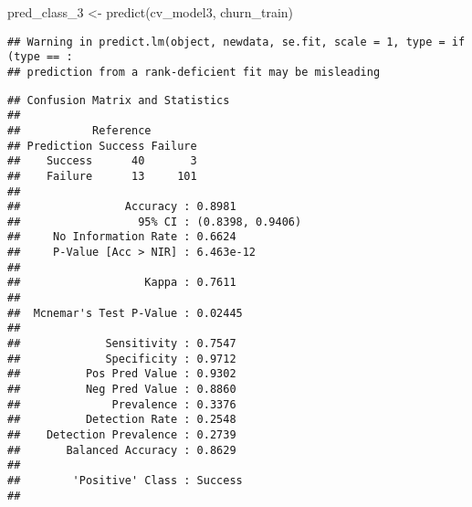 \documentclass[
]{article}
\newenvironment{Shaded}{\begin{snugshade}}{\end{snugshade}}
\newcommand{\AttributeTok}[1]{\textcolor[rgb]{0.77,0.63,0.00}{#1}}
\newcommand{\CommentTok}[1]{\textcolor[rgb]{0.56,0.35,0.01}{\textit{#1}}}
\newcommand{\FunctionTok}[1]{\textcolor[rgb]{0.00,0.00,0.00}{#1}}
\newcommand{\NormalTok}[1]{#1}
\newcommand{\OtherTok}[1]{\textcolor[rgb]{0.56,0.35,0.01}{#1}}
\newcommand{\SpecialCharTok}[1]{\textcolor[rgb]{0.00,0.00,0.00}{#1}}
\newcommand{\StringTok}[1]{\textcolor[rgb]{0.31,0.60,0.02}{#1}}
\begin{document}
\begin{Shaded}
\begin{Highlighting}[]
\NormalTok{pred\_class\_3 }\OtherTok{\textless{}{-}} \FunctionTok{predict}\NormalTok{(cv\_model3, churn\_train)}
\end{Highlighting}
\end{Shaded}

\begin{verbatim}
## Warning in predict.lm(object, newdata, se.fit, scale = 1, type = if (type == :
## prediction from a rank-deficient fit may be misleading
\end{verbatim}

\begin{Shaded}
\end{Shaded}

\begin{verbatim}
## Confusion Matrix and Statistics
## 
##           Reference
## Prediction Success Failure
##    Success      40       3
##    Failure      13     101
##                                           
##                Accuracy : 0.8981          
##                  95% CI : (0.8398, 0.9406)
##     No Information Rate : 0.6624          
##     P-Value [Acc > NIR] : 6.463e-12       
##                                           
##                   Kappa : 0.7611          
##                                           
##  Mcnemar's Test P-Value : 0.02445         
##                                           
##             Sensitivity : 0.7547          
##             Specificity : 0.9712          
##          Pos Pred Value : 0.9302          
##          Neg Pred Value : 0.8860          
##              Prevalence : 0.3376          
##          Detection Rate : 0.2548          
##    Detection Prevalence : 0.2739          
##       Balanced Accuracy : 0.8629          
##                                           
##        'Positive' Class : Success         
## 
\end{verbatim}
\end{document}
